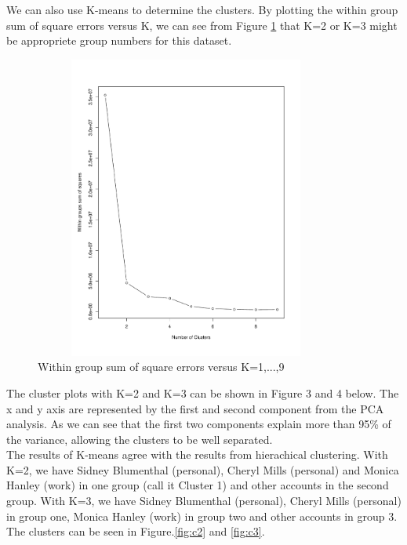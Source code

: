 We can also use K-means to determine the clusters. By plotting the within group sum of square errors versus K, we can see from Figure \ref{fig:determine} that K=2 or K=3 might be appropriete group numbers for this dataset.
\begin{figure}[h!]
    \centering
    \includegraphics[width=10cm,height=10cm]
    {daitong_and_yihe/clusterd}
    \caption{Within group sum of square errors versus K=1,...,9}
    \label{fig:determine}
\end{figure}


The cluster plots with K=2 and K=3 can be shown in Figure 3 and 4 below. The x and y axis are represented by the first and second component from the PCA analysis. As we can see that the first two components explain more than 95\% of the variance, allowing the clusters to be well separated. 
\\
The results of K-means agree with the results from hierachical clustering. With K=2, we have Sidney Blumenthal (personal), Cheryl Mills (personal) and Monica Hanley (work) in one group (call it Cluster 1) and other accounts in the second group. With K=3, we have Sidney Blumenthal (personal), Cheryl Mills (personal) in group one, Monica Hanley (work) in group two and other accounts in group 3. The clusters can be seen in Figure.\ref{fig:c2} and \ref{fig:c3}.

